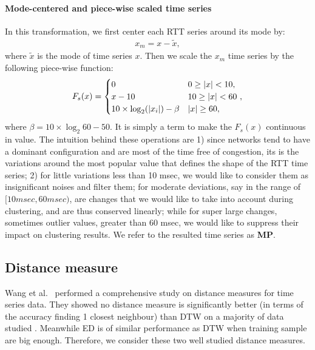 \paragraph*{Mode-centered and piece-wise scaled time series}  In this transformation, we first center each RTT series around its mode by:
\begin{align*}
x_m = x-\tilde x,
\end{align*}
where $\tilde x$ is the mode of time series $x$. Then we scale the $x_m$ time series by the following piece-wise function:
\begin{align*}
F_s(x) =
\begin{cases} 
       0    \hfill & \text{$0 \geq |x| < 10$}, \\
       x-10 \hfill & \text{$10 \geq |x| < 60$ }, \\
       10 \times \log_2 (|x_i|) - \beta \hfill & \text{$|x|\geq 60$},\\
  \end{cases}
\end{align*}
where $\beta = 10 \times \log_2 60 - 50$.
It is simply a term to make the $F_s(x)$ continuous in value. 
The intuition behind these operations are 1) since networks tend to have a dominant configuration and are most of the time free of congestion, its is the variations around the most popular value that defines the shape of the RTT time series; 2) for little variations less than 10 msec, we would like to consider them as insignificant noises and filter them; for moderate deviations, say in the range of $[10 msec, 60 msec)$, are changes that we would like to take into account during clustering, and are thus conserved linearly; while for super large changes, sometimes outlier values, greater than 60 msec, we would like to suppress their impact on clustering results. We refer to the resulted time series as \textbf{MP}.

\subsection{Distance measure}
Wang et al.\ \cite{Wang2013} performed a comprehensive study on distance measures for time series data. They showed no distance measure is significantly better (in terms of the accuracy finding 1 closest neighbour) than \acf{DTW} on a majority of data studied \cite{UCRArchive}.
Meanwhile \ac{ED} is of similar performance as \acf{DTW} when training sample are big enough. 
Therefore, we consider these two well studied distance measures.

